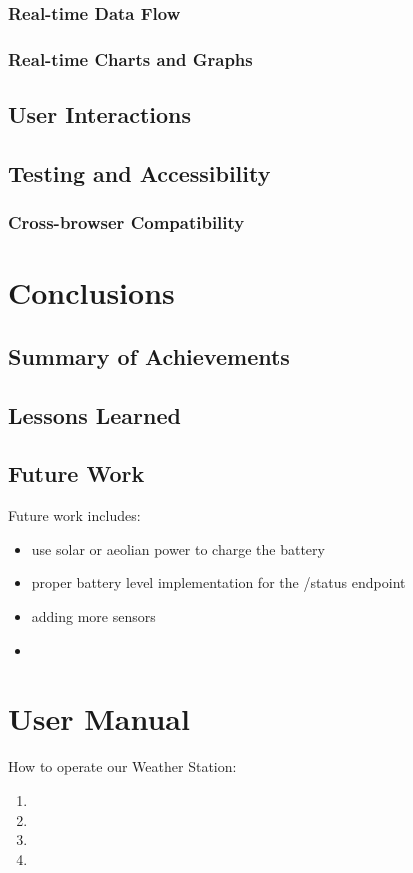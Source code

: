 \documentclass{article}
\begin{document}
    \subsubsection{Real-time Data Flow}
    \subsubsection{Real-time Charts and Graphs}
\subsection{User Interactions}
\subsection{Testing and Accessibility}
    \subsubsection{Cross-browser Compatibility}

\section{Conclusions}
    \subsection{Summary of Achievements}
    
    \subsection{Lessons Learned}
    \subsection{Future Work}
    Future work includes:
    \begin{itemize}
        \item use solar or aeolian power to charge the battery
        \item proper battery level implementation for the /status endpoint
        \item adding more sensors
        \item 
    \end{itemize}

\appendix

\section{User Manual}
How to operate our Weather Station:
\begin{enumerate}
  \item 
  \item 
  \item 
  \item 
\end{enumerate}
\end{document}
